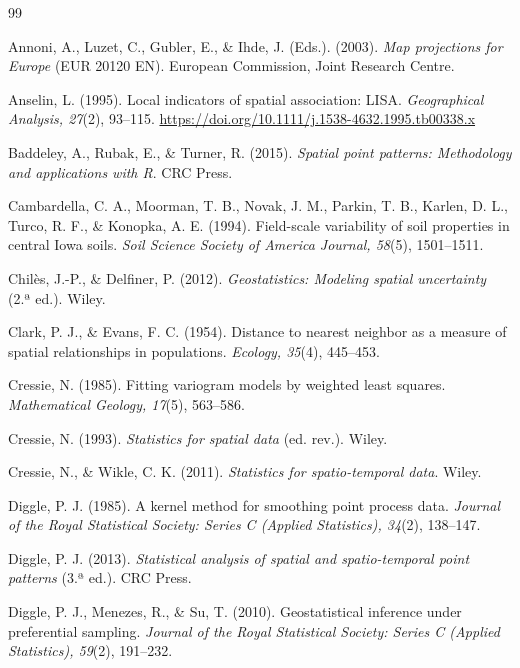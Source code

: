 \documentclass[12pt,a4paper]{article}
\begin{document}
\clearpage
\begin{thebibliography}{99}

 Annoni, A., Luzet, C., Gubler, E., \& Ihde, J. (Eds.). (2003). \emph{Map projections for Europe} (EUR 20120 EN). European Commission, Joint Research Centre.

 Anselin, L. (1995). Local indicators of spatial association: LISA. \emph{Geographical Analysis, 27}(2), 93--115. \url{https://doi.org/10.1111/j.1538-4632.1995.tb00338.x}

 Baddeley, A., Rubak, E., \& Turner, R. (2015). \emph{Spatial point patterns: Methodology and applications with R}. CRC Press.

 Cambardella, C. A., Moorman, T. B., Novak, J. M., Parkin, T. B., Karlen, D. L., Turco, R. F., \& Konopka, A. E. (1994). Field-scale variability of soil properties in central Iowa soils. \emph{Soil Science Society of America Journal, 58}(5), 1501--1511.

 Chilès, J.-P., \& Delfiner, P. (2012). \emph{Geostatistics: Modeling spatial uncertainty} (2.ª ed.). Wiley.

 Clark, P. J., \& Evans, F. C. (1954). Distance to nearest neighbor as a measure of spatial relationships in populations. \emph{Ecology, 35}(4), 445--453.

 Cressie, N. (1985). Fitting variogram models by weighted least squares. \emph{Mathematical Geology, 17}(5), 563--586.

 Cressie, N. (1993). \emph{Statistics for spatial data} (ed. rev.). Wiley.

 Cressie, N., \& Wikle, C. K. (2011). \emph{Statistics for spatio-temporal data}. Wiley.

 Diggle, P. J. (1985). A kernel method for smoothing point process data. \emph{Journal of the Royal Statistical Society: Series C (Applied Statistics), 34}(2), 138--147.

 Diggle, P. J. (2013). \emph{Statistical analysis of spatial and spatio-temporal point patterns} (3.ª ed.). CRC Press.

 Diggle, P. J., Menezes, R., \& Su, T. (2010). Geostatistical inference under preferential sampling. \emph{Journal of the Royal Statistical Society: Series C (Applied Statistics), 59}(2), 191--232.


\end{thebibliography}
\end{document}
